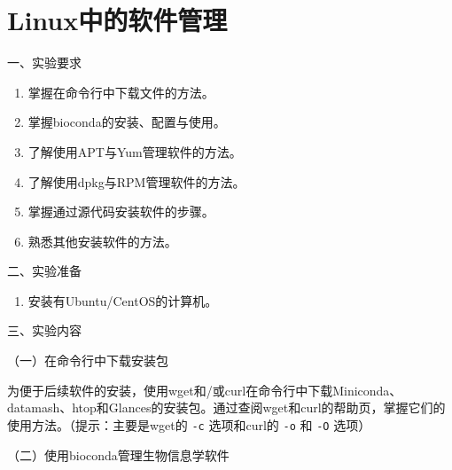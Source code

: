 \chapter{Linux中的软件管理}

\noindent
一、实验要求
\begin{enumerate}
  \item 掌握在命令行中下载文件的方法。
  \item 掌握bioconda的安装、配置与使用。
  \item 了解使用APT与Yum管理软件的方法。
  \item 了解使用dpkg与RPM管理软件的方法。
  \item 掌握通过源代码安装软件的步骤。
  \item 熟悉其他安装软件的方法。
\end{enumerate}

\vspace{0.2in}
\noindent
二、实验准备
\begin{enumerate}
  \item 安装有Ubuntu/CentOS的计算机。
\end{enumerate}

\vspace{0.2in}
\noindent
三、实验内容

\vspace{0.1in}
（一）在命令行中下载安装包

为便于后续软件的安装，使用wget和/或curl在命令行中下载Miniconda、datamash、htop和Glances的安装包。通过查阅wget和curl的帮助页，掌握它们的使用方法。（提示：主要是wget的 \verb|-c| 选项和curl的 \verb|-o| 和 \verb|-O| 选项）

\vspace{0.1in}
（二）使用bioconda管理生物信息学软件

